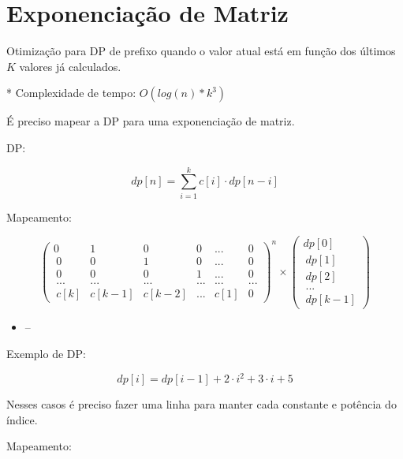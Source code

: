 \documentclass[11pt, a4paper, oneside]{book}
\begin{document}
\hfill

\section{Exponenciação de Matriz}


Otimização para DP de prefixo quando o valor atual está em função dos últimos $K$ valores já calculados.   



* Complexidade de tempo: $O(log(n)*k^3)$



É preciso mapear a DP para uma exponenciação de matriz.



\textbf{} 


DP:   



$$ dp[n] = \sum_{i=1}^{k} c[i] \cdot dp[n - i] $$ 



Mapeamento:   



$$ \begin{pmatrix} 0&1&0&0&...&0 \\\ 0&0&1&0&...&0 \\\ 0&0&0&1&...&0 \\\ ...&...&...&...&...&... \\\ c[k]&c[k-1]&c[k-2]&...&c[1]&0 \end{pmatrix}^n \times \begin{pmatrix} dp[0] \\\ dp[1] \\\ dp[2] \\\ ... \\\ dp[k-1] \end{pmatrix} $$



\begin{itemize}
\item --
\end{itemize}

\textbf{} 


Exemplo de DP:   



$$ dp[i] = dp[i-1] + 2 \cdot i^2 + 3 \cdot i + 5 $$



Nesses casos é preciso fazer uma linha para manter cada constante e potência do índice.



Mapeamento:
\end{document}

